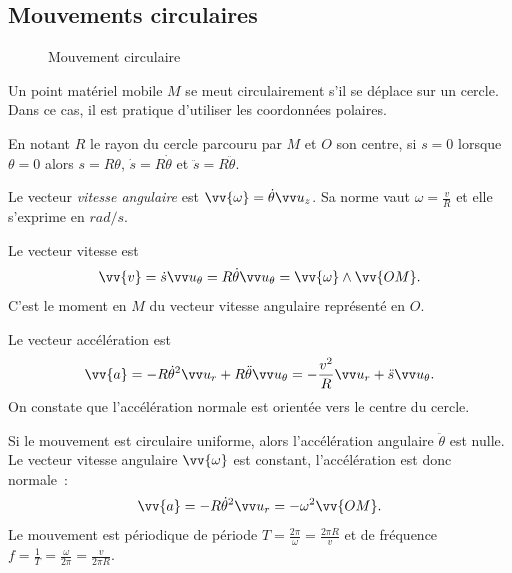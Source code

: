 \subsection{Mouvements circulaires}
\label{chap1-subsec:mvtcirc}

 \begin{figure}
   \centering
   \caption{Mouvement circulaire}
   \label{fig:mvt-circulaire}
 \end{figure}

Un point matériel mobile $M$ se meut circulairement s'il se déplace sur un cercle. Dans ce cas, il est pratique d'utiliser les coordonnées polaires.

En notant $R$ le rayon du cercle parcouru par $M$ et $O$ son centre, si $s=0$ lorsque $\theta=0$ alors $s=R\theta$, $\dot{s}=R\dot{\theta}$ et $\ddot{s}=R\ddot{\theta}$.

Le vecteur \emph{vitesse angulaire} est $\vv{\omega}=\dot{\theta}\uz$. Sa norme vaut $\omega=\frac{v}{R}$ et elle s'exprime en $\si{rad\per s}$. 

Le vecteur vitesse est 
\begin{equation}
 \vv{v}=\dot{s}\utheta=R\dot{\theta} \utheta= \vv{\omega} \wedge \vv{OM}.
\end{equation}
C'est le moment en $M$ du vecteur vitesse angulaire représenté en $O$.

Le vecteur accélération est
\begin{equation}
\vv{a}=-R\dot{\theta}^2\ur +R\ddot{\theta}\utheta=-\frac{v^2}{R}\ur+\ddot{s}\utheta.  
\end{equation}
On constate que l'accélération normale est orientée vers le centre du cercle.

Si le mouvement est circulaire uniforme, alors l'accélération angulaire $\ddot{\theta}$ est nulle. Le vecteur vitesse angulaire $\vv{\omega}$ est constant, l'accélération est donc normale~:
\begin{equation}
  \vv{a}=-R\dot{\theta}^2\ur =-\omega^2\vv{OM}.
\end{equation}
Le mouvement est périodique de période $T=\frac{2\pi}{\omega}=\frac{2\pi R}{v}$ et de fréquence $f=\frac{1}{T}=\frac{\omega}{2\pi}=\frac{v}{2\pi R}$.

